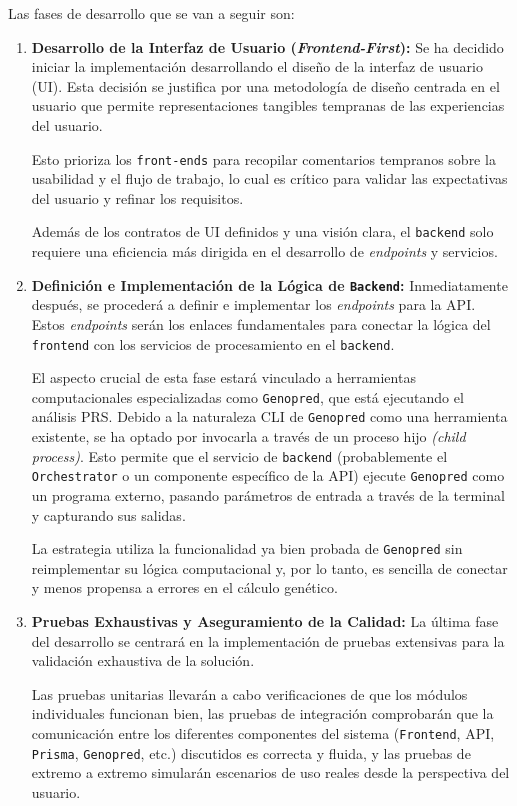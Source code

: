 Las fases de desarrollo que se van a seguir son:
\begin{enumerate}
    \item \textbf{Desarrollo de la Interfaz de Usuario (\textit{Frontend-First}):}
    Se ha decidido iniciar la implementación desarrollando el diseño de la interfaz de usuario (UI). Esta decisión se justifica por una metodología de diseño centrada en el usuario que permite representaciones tangibles tempranas de las experiencias del usuario.
    
    Esto prioriza los \texttt{front-ends} para recopilar comentarios tempranos sobre la usabilidad y el flujo de trabajo, lo cual es crítico para validar las expectativas del usuario y refinar los requisitos. 
    
    Además de los contratos de UI definidos y una visión clara, el \texttt{backend} solo requiere una eficiencia más dirigida en el desarrollo de \textit{endpoints} y servicios. 
    \item \textbf{Definición e Implementación de la Lógica de \texttt{Backend}:} 
    Inmediatamente después, se procederá a definir e implementar los \textit{endpoints} para la API. Estos \textit{endpoints} serán los enlaces fundamentales para conectar la lógica del \texttt{frontend} con los servicios de procesamiento en el \texttt{backend}. 
    
    El aspecto crucial de esta fase estará vinculado a herramientas computacionales especializadas como \texttt{Genopred}, que está ejecutando el análisis PRS. Debido a la naturaleza CLI de \texttt{Genopred} como una herramienta existente, se ha optado por invocarla a través de un proceso hijo \textit{(child process)}. Esto permite que el servicio de \texttt{backend} (probablemente el \texttt{Orchestrator} o un componente específico de la API) ejecute \texttt{Genopred} como un programa externo, pasando parámetros de entrada a través de la terminal y capturando sus salidas.
    
    La estrategia utiliza la funcionalidad ya bien probada de \texttt{Genopred} sin reimplementar su lógica computacional y, por lo tanto, es sencilla de conectar y menos propensa a errores en el cálculo genético. 
    \item \textbf{Pruebas Exhaustivas y Aseguramiento de la Calidad:}
    La última fase del desarrollo se centrará en la implementación de pruebas extensivas para la validación exhaustiva de la solución. 
    
    Las pruebas unitarias llevarán a cabo verificaciones de que los módulos individuales funcionan bien, las pruebas de integración comprobarán que la comunicación entre los diferentes componentes del sistema (\texttt{Frontend}, API, \texttt{Prisma}, \texttt{Genopred}, etc.) discutidos es correcta y fluida, y las pruebas de extremo a extremo simularán escenarios de uso reales desde la perspectiva del usuario. 
    

\end{enumerate}
